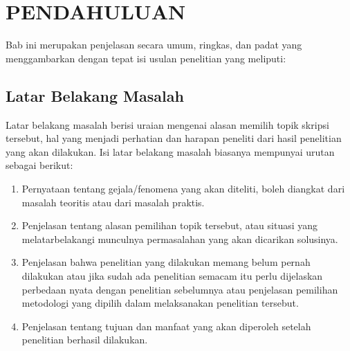 
\chapter[PENDAHULUAN]{\\ PENDAHULUAN}

Bab ini merupakan penjelasan secara umum, ringkas, dan padat yang menggambarkan dengan tepat isi usulan penelitian yang meliputi:

\section{Latar Belakang Masalah}
\begin{sectioncontent}
    \hspace{\parindent}Latar belakang masalah berisi uraian mengenai alasan memilih topik skripsi tersebut, hal yang menjadi perhatian dan harapan peneliti dari hasil penelitian yang akan dilakukan. Isi latar belakang masalah biasanya mempunyai urutan sebagai berikut:

    \begin{enumerate}[leftmargin=0.5cm,label=\alph*.]
        \item Pernyataan tentang gejala/fenomena yang akan diteliti, boleh diangkat dari masalah teoritis atau dari masalah praktis.
        \item Penjelasan tentang alasan pemilihan topik tersebut, atau situasi yang melatarbelakangi munculnya permasalahan yang akan dicarikan solusinya.
        \item Penjelasan bahwa penelitian yang dilakukan memang belum pernah dilakukan atau jika sudah ada penelitian semacam itu perlu dijelaskan perbedaan nyata dengan penelitian sebelumnya atau penjelasan pemilihan metodologi yang dipilih dalam melaksanakan penelitian tersebut.
        \item Penjelasan tentang tujuan dan manfaat yang akan diperoleh setelah penelitian berhasil dilakukan.
    \end{enumerate}
\end{sectioncontent}

